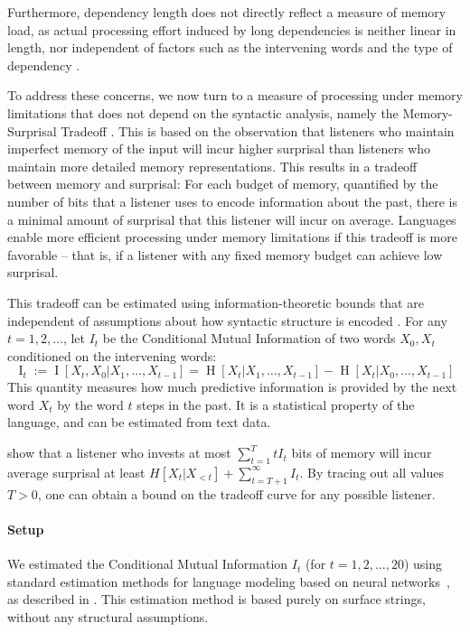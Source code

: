 \documentclass[11pt,a4paper]{article}
\begin{document}
Furthermore, dependency length does not directly reflect a measure of memory load, as actual processing effort induced by long dependencies is neither linear in length, nor independent of factors such as the intervening words and the type of dependency \citep{gibson1998linguistic,lewis-activation-based-2005,demberg-data-2008}.

To address these concerns, we now turn to a measure of processing under memory limitations that does not depend on the syntactic analysis, namely the Memory-Surprisal Tradeoff \citep{hahn2019memory}.
This is based on the observation that listeners who maintain imperfect memory of the input will incur higher surprisal than listeners who maintain more detailed memory representations.
This results in a tradeoff between memory and surprisal:
For each budget of memory, quantified by the number of bits that a listener uses to encode information about the past, there is a minimal amount of surprisal that this listener will incur on average.
Languages enable more efficient processing under memory limitations if this tradeoff is more favorable -- that is, if a listener with any fixed memory budget can achieve low surprisal.

This tradeoff can be estimated using information-theoretic bounds that are independent of assumptions about how syntactic structure is encoded \citep{hahn2019memory}.
For any $t = 1, 2, \dots$, let $I_t$ be the Conditional Mutual Information of two words $X_0, X_t$ conditioned on the intervening words:
\begin{equation}
        \operatorname{I}_t := \operatorname{I}[X_t, X_0 | X_1, \dots, X_{t-1}] = \operatorname{H}[X_t|X_1, \dots, X_{t-1}] - \operatorname{H}[X_t|X_0, \dots, X_{t-1}] 
\end{equation}
This quantity  measures how much predictive information is provided by the next word $X_t$ by the word $t$ steps in the past.
It is a statistical property of the language, and can be estimated from text data.

\citet{hahn2019memory} show that a listener who invests at most $\sum_{t=1}^T t I_t$ bits of memory will incur average surprisal at least $H[X_t| X_{<t}] + \sum_{t=T+1}^\infty I_t$.
By tracing out all values $T >0$, one can obtain a bound on the tradeoff curve for any possible listener.

\paragraph{Setup}
We estimated the Conditional Mutual Information $I_t$ (for $t=1,2,\dots,20$) using standard estimation methods for language modeling based on neural networks~\citep{hochreiter-long-1997}, as described in \citet{hahn2019memory}.
This estimation method is based purely on surface strings, without any structural assumptions.
\end{document}
